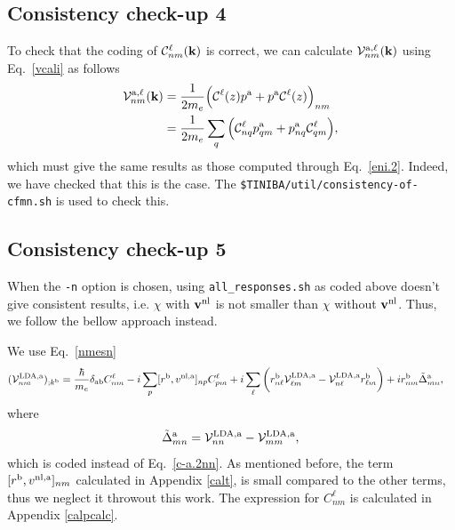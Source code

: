\subsection{Consistency check-up 4}\label{ccu4}

To check that the coding of 
${\mathbf{\cal C}}^\ell_{nm}(\mathbf{k})$ 
is correct, we can calculate ${\mathbf{\cal V}}^{\mathrm{a},\ell}_{nm}(\mathbf{k})$ using
Eq.~\eqref{vcali} as follows
\begin{align}\label{ccu.1}
{\mathbf{\cal V}}^{\mathrm{a},\ell}_{nm}(\mathbf{k})
&=
\frac{1}{2m_e}
\Big(
{\mathbf{\cal C}}^\ell(z)p^{\mathrm{a}}
+
p^{\mathrm{a}}{\mathbf{\cal C}}^\ell(z)
\Big)_{nm}
\nonumber\\
&=
\frac{1}{2m_e}
\sum_q
\Big(
{\mathbf{\cal C}}^\ell_{nq}p^{\mathrm{a}}_{qm}
+
p^{\mathrm{a}}_{nq}{\mathbf{\cal C}}^\ell_{qm}
\Big)
,
\end{align}
which must give the same results as those computed through
Eq.~\eqref{eni.2}.
Indeed, we have checked that this is the case. The
\verb=$TINIBA/util/consistency-of-cfmn.sh=
is used to check this.

\subsection{Consistency check-up 5}\label{ccu5}

When the \verb=-n= option is chosen, using \verb=all_responses.sh= as
coded above doesn't give consistent results, i.e. $\chi$
 with $\mathbf{v}^{\mathrm{nl}}$  
is not smaller than $\chi$ 
 without $\mathbf{v}^{\mathrm{nl}}$. Thus, we follow the bellow approach instead.

We use Eq.~\eqref{nmesn}
\begin{align}\label{nmesnn}
({\mathbf{\cal V}}^{\mathrm{LDA},\mathrm{a}}_{nm})_{;k^{\mathrm{b}}}&=
\frac{\hbar}{m_e}\delta_{\mathrm{a}\mathrm{b}}
C^\ell_{nm} 
-i 
\sum_p 
[r^{\mathrm{b}},v^{\mathrm{nl},\mathrm{a}}]_{np}C^\ell_{pm} 
+i 
\sum_{\ell}
\bigg(
r^{\mathrm{b}}_{n\ell}  
{\mathbf{\cal V}}^{\mathrm{LDA},\mathrm{a}}_{\ell m}
-
{\mathbf{\cal V}}^{\mathrm{LDA},\mathrm{a}}_{n\ell}   
r^{\mathrm{b}}_{\ell m}
\bigg)  
+i  
r^{\mathrm{b}}_{nm}
\tilde\Delta^{\mathrm{a}}_{mn}
,
\end{align}  
where 
\begin{eqnarray}\label{tdeln}
\tilde\Delta^{\mathrm{a}}_{mn}
=
{\mathbf{\cal V}}^{\mathrm{LDA},\mathrm{a}}_{nn}  
-
{\mathbf{\cal V}}^{\mathrm{LDA},\mathrm{a}}_{mm}  
, 
\end{eqnarray}
which is coded instead of Eq.~\eqref{c-a.2nn}. 
 As mentioned before, the term $[r^{\mathrm{b}},v^{\mathrm{nl},\mathrm{a}}]_{nm}$
calculated in Appendix \ref{calt}, is small 
compared to the other terms, thus we neglect it throwout this work.\cite{valerie} 
The expression for $C^\ell_{nm}$ is calculated in Appendix \ref{calpcalc}.

